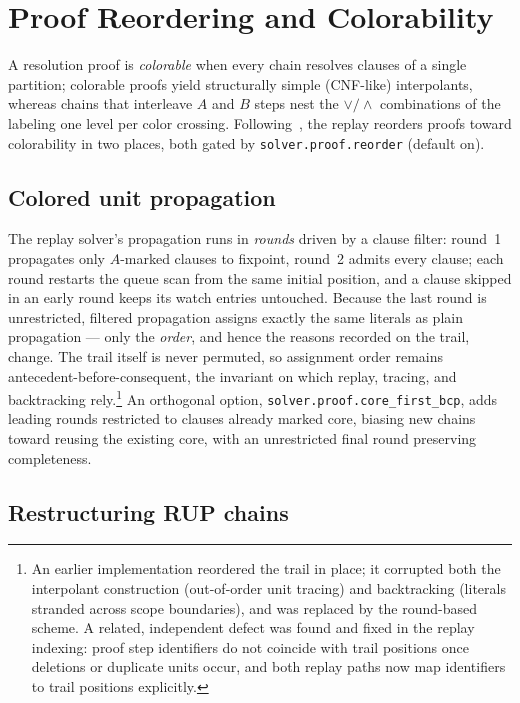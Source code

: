 \documentclass[11pt]{article}
\newcommand{\opt}[1]{\texttt{#1}}
\begin{document}
\section{Proof Reordering and Colorability}
\label{sec:reorder}

A resolution proof is \emph{colorable} when every chain resolves clauses of
a single partition; colorable proofs yield structurally simple (CNF-like)
interpolants, whereas chains that interleave $A$ and $B$ steps nest the
$\vee/\wedge$ combinations of the labeling one level per color crossing.
Following~\cite{drup-itp}, the replay reorders proofs toward colorability in
two places, both gated by \opt{solver.proof.reorder} (default on).

\subsection{Colored unit propagation}

The replay solver's propagation runs in \emph{rounds} driven by a clause
filter: round~1 propagates only $A$-marked clauses to fixpoint, round~2
admits every clause; each round restarts the queue scan from the same
initial position, and a clause skipped in an early round keeps its watch
entries untouched. Because the last round is unrestricted, filtered
propagation assigns exactly the same literals as plain propagation --- only
the \emph{order}, and hence the reasons recorded on the trail, change. The
trail itself is never permuted, so assignment order remains
antecedent-before-consequent, the invariant on which replay, tracing, and
backtracking rely.\footnote{An earlier implementation reordered the trail in
place; it corrupted both the interpolant construction (out-of-order unit
tracing) and backtracking (literals stranded across scope boundaries), and
was replaced by the round-based scheme. A related, independent defect was
found and fixed in the replay indexing: proof step identifiers do not
coincide with trail positions once deletions or duplicate units occur, and
both replay paths now map identifiers to trail positions explicitly.}
An orthogonal option, \opt{solver.proof.core\_first\_bcp}, adds leading
rounds restricted to clauses already marked core, biasing new chains toward
reusing the existing core, with an unrestricted final round preserving
completeness.

\subsection{Restructuring RUP chains}
\end{document}
